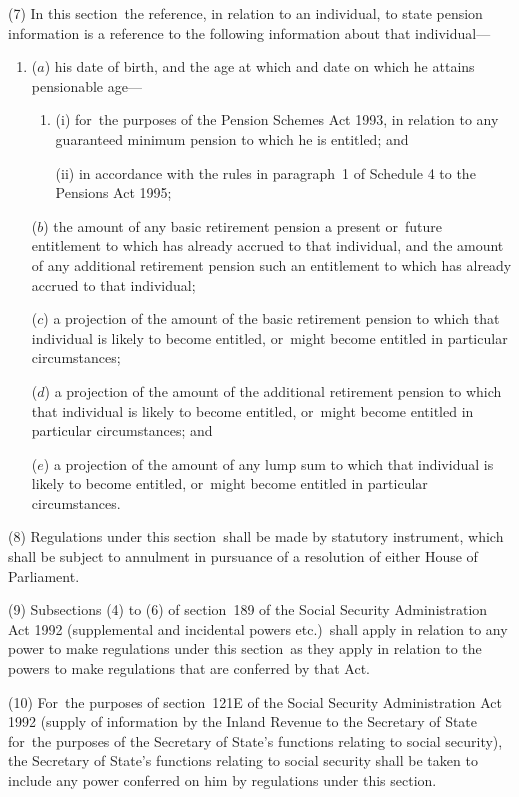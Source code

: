 \documentclass[12pt,a4paper]{article}
\begin{document}
(7) In this section~the reference, in relation to an individual, to state pension information is a reference to the following information about that individual—
\begin{enumerate}\item[]
($a$) his date of birth, and the age at which and date on which he attains pensionable age—
\begin{enumerate}\item[]
(i) for~the purposes of the Pension Schemes Act 1993, in relation to any guaranteed minimum pension to which he is entitled; and

(ii) in accordance with the rules in paragraph~1 of Schedule 4 to the Pensions Act 1995;
\end{enumerate}

($b$) the amount of any basic retirement pension a present or~future entitlement to which has already accrued to that individual, and the amount of any additional retirement pension such an entitlement to which has already accrued to that individual;

($c$) a projection of the amount of the basic retirement pension to which that individual is likely to become entitled, or~might become entitled in particular circumstances; 

($d$) a projection of the amount of the additional retirement pension to which that individual is likely to become entitled, or~might become entitled in particular circumstances;
%
and

($e$) a projection of the amount of any lump sum to which that individual is likely to become entitled, or~might become entitled in particular circumstances.
\end{enumerate}

(8) Regulations under this section~shall be made by statutory instrument, which shall be subject to annulment in pursuance of a resolution of either House of Parliament.

(9) Subsections (4)  to (6)  of section~189 of the Social Security Administration Act 1992 (supplemental and incidental powers etc.)\ shall apply in relation to any power to make regulations under this section~as they apply in relation to the powers to make regulations that are conferred by that Act.

(10) For~the purposes of section~121E of the Social Security Administration Act 1992 (supply of information by the Inland Revenue to the Secretary of State for~the purposes of the Secretary of State’s functions relating to social security), the Secretary of State’s functions relating to social security shall be taken to include any power conferred on him by regulations under this section.
\end{document}
